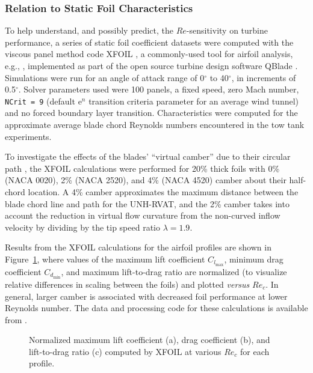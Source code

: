 \subsubsection{Relation to Static Foil Characteristics}


To help understand, and possibly predict, the $Re$-sensitivity on turbine
performance, a series of static foil coefficient datasets were computed with the
viscous panel method code XFOIL \cite{Drela1989}, a commonly-used tool for
airfoil analysis, e.g., \cite{Castelli2011, Walker2014}, implemented as part of
the open source turbine design software QBlade \cite{Marten2013}. Simulations
were run for an angle of attack range of 0$^{\circ}$ to 40$^{\circ}$, in
increments of 0.5$^{\circ}$. Solver parameters used were 100 panels, a fixed
speed, zero Mach number, \texttt{NCrit = 9} (default $\mathrm{e}^n$ transition
criteria parameter for an average wind tunnel) and no forced boundary layer
transition. Characteristics were computed for the approximate average blade
chord Reynolds numbers encountered in the tow tank experiments.

To investigate the effects of the blades' ``virtual camber'' due to their
circular path \cite{Migliore1980}, the XFOIL calculations were performed for
20\% thick foils with 0\% (NACA 0020), 2\% (NACA 2520), and 4\% (NACA 4520)
camber about their half-chord location. A 4\% camber approximates the maximum
distance between the blade chord line and path for the UNH-RVAT, and the 2\%
camber takes into account the reduction in virtual flow curvature from the
non-curved inflow velocity by dividing by the tip speed ratio $\lambda=1.9$.

Results from the XFOIL calculations for the airfoil profiles are shown in
Figure~\ref{fig:foil-Re-dep}, where values of the maximum lift coefficient
$C_{l_{\max}}$, minimum drag coefficient $C_{d_{\min}}$, and maximum
lift-to-drag ratio are normalized (to visualize relative differences in scaling
between the foils) and plotted \textit{versus} $Re_c$. In general, larger camber
is associated with decreased foil performance at lower Reynolds number. The data
and processing code for these calculations is available from
\cite{Bachant2016-NACAXX20-XFOIL}.

\begin{figure}[ht]
\centering


\caption{Normalized maximum lift coefficient (a), drag coefficient (b), and
    lift-to-drag ratio (c) computed by XFOIL at various $Re_c$  for each profile.}

\label{fig:foil-Re-dep}
\end{figure}

